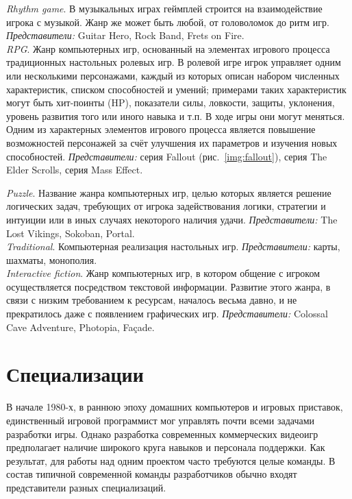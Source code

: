 \emph{Rhythm game}. В музыкальных играх геймплей строится на взаимодействие игрока с музыкой. Жанр 
же может быть любой, от головоломок до ритм игр. \emph{Представители:} Guitar Hero, Rock Band, 
Frets on Fire. \\

\emph{RPG}. Жанр компьютерных игр, основанный на элементах игрового процесса традиционных настольных 
ролевых игр. В ролевой игре игрок управляет одним или несколькими персонажами, каждый из которых 
описан набором численных характеристик, списком способностей и умений; примерами таких характеристик 
могут быть хит-поинты (HP), показатели силы, ловкости, защиты, уклонения, уровень развития того или 
иного навыка и т.п. В ходе игры они могут меняться. Одним из характерных элементов игрового процесса 
является повышение возможностей персонажей за счёт улучшения их параметров и изучения новых 
способностей. \emph{Представители:} серия Fallout (рис.~\ref{img:fallout}), серия The Elder Scrolls, 
серия Mass Effect.

\emph{Puzzle}. Название жанра компьютерных игр, целью которых является решение логических задач, 
требующих от игрока задействования логики, стратегии и интуиции или в иных случаях некоторого наличия 
удачи. \emph{Представители:} The Lost Vikings, Sokoban, Portal.\\

\emph{Traditional}. Компьютерная реализация настольных игр. \emph{Представители:} карты, шахматы, 
монополия.\\

\emph{Interactive fiction}. Жанр компьютерных игр, в котором общение с игроком осуществляется посредством 
текстовой информации. Развитие этого жанра, в связи с низким требованием к ресурсам, началось весьма 
давно, и не прекратилось даже с появлением графических игр.
\emph{Представители:} Colossal Cave Adventure, Photopia, Façade.

\chapter{Специализации}
В начале 1980-х, в раннюю эпоху домашних компьютеров и игровых приставок, единственный игровой программист
мог управлять почти всеми задачами разработки игры. Однако разработка современных коммерческих видеоигр
предполагает наличие широкого круга навыков и персонала поддержки. Как результат, для работы над одним
проектом часто требуются целые команды. В состав типичной современной команды разработчиков обычно входят
представители разных специализаций.

